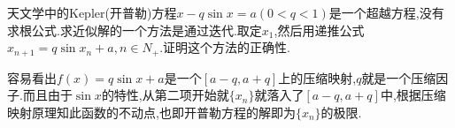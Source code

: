 \documentclass[cn,chinese,fontset]{elegantbook}
\begin{document}
            \begin{exercise}
                天文学中的Kepler(开普勒)方程$x-q\sin x=a(0<q<1)$是一个超越方程,没有求根公式.求近似解的一个方法是通过迭代.取定$x_1$,然后用递推公式$x_{n+1}=q\sin x_n+a,n\in N_+$.证明这个方法的正确性.
            \end{exercise}
            \begin{solution}
                容易看出$f(x)=q\sin x+a$是一个$[a-q,a+q]$上的压缩映射,$q$就是一个压缩因子.而且由于$\sin x$的特性,从第二项开始就$\{x_n\}$就落入了$[a-q,a+q]$中,根据压缩映射原理知此函数的不动点,也即开普勒方程的解即为$\{x_n\}$的极限.
            \end{solution}
\end{document}
